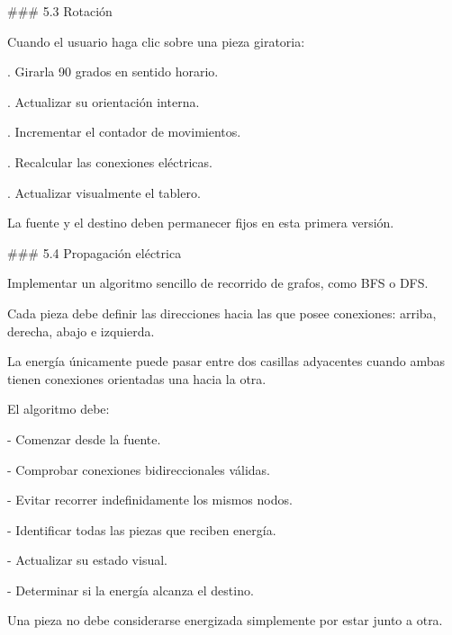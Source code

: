 \par\smallskip
\noindent \#\#\# 5.3 Rotación\par
\par\smallskip
\noindent Cuando el usuario haga clic sobre una pieza giratoria:\par
\par\smallskip
{}. Girarla 90 grados en sentido horario.\par
{}. Actualizar su orientación interna.\par
{}. Incrementar el contador de movimientos.\par
{}. Recalcular las conexiones eléctricas.\par
{}. Actualizar visualmente el tablero.\par
\par\smallskip
\noindent La fuente y el destino deben permanecer fijos en esta primera versión.\par
\par\smallskip
\noindent \#\#\# 5.4 Propagación eléctrica\par
\par\smallskip
\noindent Implementar un algoritmo sencillo de recorrido de grafos, como BFS o DFS.\par
\par\smallskip
\noindent Cada pieza debe definir las direcciones hacia las que posee conexiones: arriba, derecha, abajo e izquierda.\par
\par\smallskip
\noindent La energía únicamente puede pasar entre dos casillas adyacentes cuando ambas tienen conexiones orientadas una hacia la otra.\par
\par\smallskip
\noindent El algoritmo debe:\par
\par\smallskip
\noindent - Comenzar desde la fuente.\par
\noindent - Comprobar conexiones bidireccionales válidas.\par
\noindent - Evitar recorrer indefinidamente los mismos nodos.\par
\noindent - Identificar todas las piezas que reciben energía.\par
\noindent - Actualizar su estado visual.\par
\noindent - Determinar si la energía alcanza el destino.\par
\par\smallskip
\noindent Una pieza no debe considerarse energizada simplemente por estar junto a otra.\par
